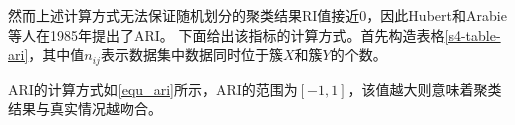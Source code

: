 然而上述计算方式无法保证随机划分的聚类结果RI值接近0，因此Hubert和Arabie等人在1985年提出了ARI。
下面给出该指标的计算方式。首先构造表格\ref{s4-table-ari}，其中值$ n_{ij} $表示数据集中数据同时位于簇$ X $和簇$ Y $的个数。

\begin{table}[htbp]
	\centering
	\renewcommand{\arraystretch}{1.3}
	\caption{ARI指标计算中间值}
	\label{s4-table-ari}
\end{table}

ARI的计算方式如\ref{equ_ari}所示，ARI的范围为$ [-1,1] $，该值越大则意味着聚类结果与真实情况越吻合。

